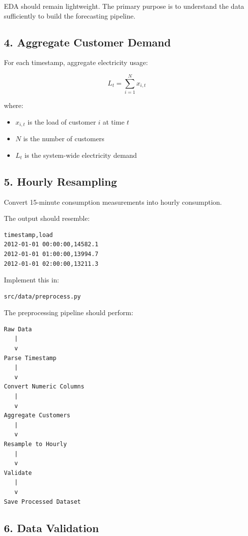\documentclass[11pt,a4paper]{article}
\begin{document}
EDA should remain lightweight. The primary purpose is to understand the data sufficiently to build the forecasting pipeline.

\subsection{4. Aggregate Customer Demand}

For each timestamp, aggregate electricity usage:

\[
L_t = \sum_{i=1}^{N} x_{i,t}
\]

where:

\begin{itemize}
    \item $x_{i,t}$ is the load of customer $i$ at time $t$
    \item $N$ is the number of customers
    \item $L_t$ is the system-wide electricity demand
\end{itemize}

\subsection{5. Hourly Resampling}

Convert 15-minute consumption measurements into hourly consumption.

The output should resemble:

\begin{lstlisting}
timestamp,load
2012-01-01 00:00:00,14582.1
2012-01-01 01:00:00,13994.7
2012-01-01 02:00:00,13211.3
\end{lstlisting}

Implement this in:

\begin{lstlisting}
src/data/preprocess.py
\end{lstlisting}

The preprocessing pipeline should perform:

\begin{verbatim}
Raw Data
   |
   v
Parse Timestamp
   |
   v
Convert Numeric Columns
   |
   v
Aggregate Customers
   |
   v
Resample to Hourly
   |
   v
Validate
   |
   v
Save Processed Dataset
\end{verbatim}

\subsection{6. Data Validation}
\end{document}
